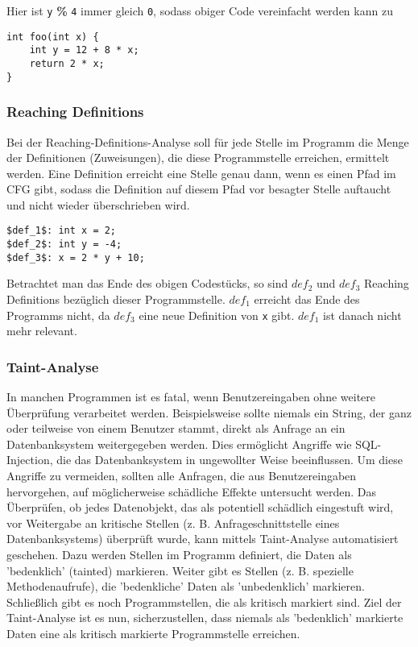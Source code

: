 Hier ist \lstinline|y| \textbf{\%} \lstinline|4| immer gleich \lstinline{0}, sodass obiger Code vereinfacht werden kann zu

\par

\begin{lstlisting}[frame=single, captionpos=b, caption=Mittels Constant-Bits-Analyse optimierte Version von Listing 4]
int foo(int x) {
	int y = 12 + 8 * x;
	return 2 * x;
} 
\end{lstlisting}

\subsubsection{Reaching Definitions}
Bei der Reaching-Definitions-Analyse soll für jede Stelle im Programm die Menge der Definitionen (Zuweisungen), die diese Programmstelle erreichen, ermittelt werden.
Eine Definition erreicht eine Stelle genau dann, wenn es einen Pfad im CFG gibt, sodass die Definition auf diesem Pfad vor besagter Stelle auftaucht und nicht wieder überschrieben wird.

\par

\begin{lstlisting}[frame=single, captionpos=b, caption=Beispielcode für Reaching-Definitions-Analyse]
$def_1$: int x = 2;
$def_2$: int y = -4;
$def_3$: x = 2 * y + 10; 
\end{lstlisting}

\par

Betrachtet man das Ende des obigen Codestücks, so sind $def_2$ und $def_3$ Reaching Definitions bezüglich dieser Programmstelle.
$def_1$ erreicht das Ende des Programms nicht, da $def_3$ eine neue Definition von \lstinline{x} gibt. $def_1$ ist danach nicht mehr relevant.

\subsubsection{Taint-Analyse}
In manchen Programmen ist es fatal, wenn Benutzereingaben ohne weitere Überprüfung verarbeitet werden. 
Beispielsweise sollte niemals ein String, der ganz oder teilweise von einem Benutzer stammt, direkt als Anfrage an ein Datenbanksystem weitergegeben werden.
Dies ermöglicht Angriffe wie SQL-Injection, die das Datenbanksystem in ungewollter Weise beeinflussen.
Um diese Angriffe zu vermeiden, sollten alle Anfragen, die aus Benutzereingaben hervorgehen, auf möglicherweise schädliche Effekte untersucht werden.
Das Überprüfen, ob jedes Datenobjekt, das als potentiell schädlich eingestuft wird, vor Weitergabe an kritische Stellen (z. B. Anfrageschnittstelle eines Datenbanksystems) überprüft wurde, kann mittels Taint-Analyse automatisiert geschehen.
Dazu werden Stellen im Programm definiert, die Daten als 'bedenklich' (tainted) markieren.
Weiter gibt es Stellen (z. B. spezielle Methodenaufrufe), die 'bedenkliche' Daten als 'unbedenklich' markieren.
Schließlich gibt es noch Programmstellen, die als kritisch markiert sind.
Ziel der Taint-Analyse ist es nun, sicherzustellen, dass niemals als 'bedenklich' markierte Daten eine als kritisch markierte Programmstelle erreichen.

